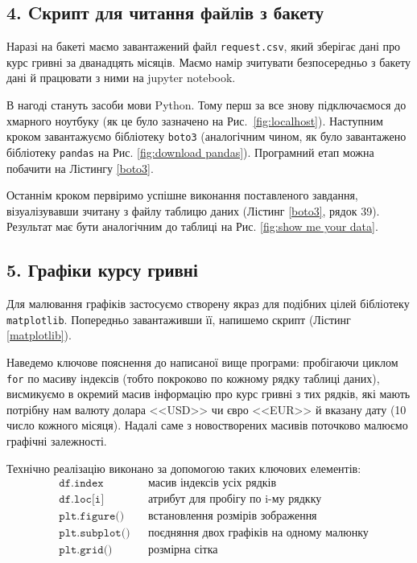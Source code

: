\documentclass[a4paper,14pt]{extarticle} %
\begin{document}
\subsection*{4. Cкрипт для читання файлів з бакету}

Наразі на бакеті маємо завантажений файл \texttt{request.csv}, який зберігає дані про курс гривні за дванадцять 
місяців. Маємо намір зчитувати безпосередньо з бакету дані й працювати з ними на jupyter notebook. 

В нагоді стануть засоби мови Python. Тому перш за все знову підключаємося до хмарного ноутбуку (як це було 
зазначено на Рис.~\ref{fig:localhost}). Нас\-тупним кроком завантажуємо бібліотеку \texttt{boto3} (аналогічним 
чином, як було завантажено бібліотеку \texttt{pandas} на Рис. \ref{fig:download pandas}). Програмний етап можна 
побачити на Лістингу \ref{boto3}. 

Останнім кроком первіримо успішне виконання поставленого завдання, візуалізувавши зчитану з файлу таблицю даних 
(Лістинг \ref{boto3}, рядок 39). Результат має бути аналогічним до таблиці на Рис. \ref{fig:show me your data}. 



\subsection*{5. Графіки курсу гривні}

Для малювання графіків застосуємо створену якраз для подібних цілей бібліотеку \texttt{matplotlib}. Попередньо 
завантаживши її, напишемо скрипт (Лістинг \ref{matplotlib}).



Наведемо ключове пояснення до написаної вище програми: пробігаючи циклом \texttt{for} по масиву індексів (тобто покроково по 
кожному рядку таблиці даних), висмикуємо в окремий масив інформацію про курс гривні з тих рядків, які мають 
потрібну нам валюту долара <<USD>> чи євро <<EUR>> й вказану дату (10 число кожного місяця). Надалі саме з новостворених масивів 
поточково малюємо графічні залежності. 

Технічно реалізацію виконано за допомогою таких ключових елементів:
\begin{align*}
    & \texttt{df.index} && \text{масив індексів усіх рядків} \\
    & \texttt{df.loc[i]} && \text{атрибут для пробігу по i-му рядкку} \\
    & \texttt{plt.figure()} && \text{встановлення розмірів зображення} \\
    & \texttt{plt.subplot()} && \text{поєдняння двох графіків на одному малюнку} \\
    & \texttt{plt.grid()} && \text{розмірна сітка} \\
\end{align*}
\end{document}

